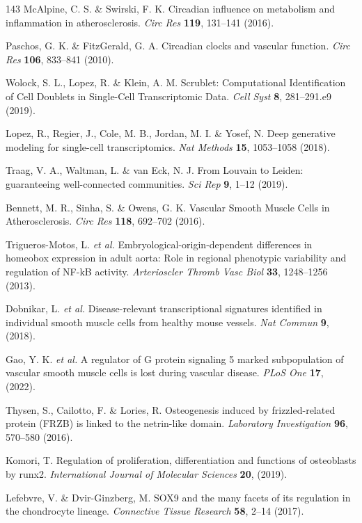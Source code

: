 \documentclass[12pt]{article}
\begin{document}
\begin{thebibliography}{143}
 McAlpine, C. S. \& Swirski, F. K. Circadian influence on metabolism and inflammation in atherosclerosis. \textit{Circ Res} \textbf{119}, 131--141 (2016).

 Paschos, G. K. \& FitzGerald, G. A. Circadian clocks and vascular function. \textit{Circ Res} \textbf{106}, 833--841 (2010).

 Wolock, S. L., Lopez, R. \& Klein, A. M. Scrublet: Computational Identification of Cell Doublets in Single-Cell Transcriptomic Data. \textit{Cell Syst} \textbf{8}, 281--291.e9 (2019).

 Lopez, R., Regier, J., Cole, M. B., Jordan, M. I. \& Yosef, N. Deep generative modeling for single-cell transcriptomics. \textit{Nat Methods} \textbf{15}, 1053--1058 (2018).

 Traag, V. A., Waltman, L. \& van Eck, N. J. From Louvain to Leiden: guaranteeing well-connected communities. \textit{Sci Rep} \textbf{9}, 1--12 (2019).

 Bennett, M. R., Sinha, S. \& Owens, G. K. Vascular Smooth Muscle Cells in Atherosclerosis. \textit{Circ Res} \textbf{118}, 692--702 (2016).

 Trigueros-Motos, L. \textit{et al.} Embryological-origin-dependent differences in homeobox expression in adult aorta: Role in regional phenotypic variability and regulation of NF-kB activity. \textit{Arterioscler Thromb Vasc Biol} \textbf{33}, 1248--1256 (2013).

 Dobnikar, L. \textit{et al.} Disease-relevant transcriptional signatures identified in individual smooth muscle cells from healthy mouse vessels. \textit{Nat Commun} \textbf{9}, (2018).

 Gao, Y. K. \textit{et al.} A regulator of G protein signaling 5 marked subpopulation of vascular smooth muscle cells is lost during vascular disease. \textit{PLoS One} \textbf{17}, (2022).

 Thysen, S., Cailotto, F. \& Lories, R. Osteogenesis induced by frizzled-related protein (FRZB) is linked to the netrin-like domain. \textit{Laboratory Investigation} \textbf{96}, 570--580 (2016).

 Komori, T. Regulation of proliferation, differentiation and functions of osteoblasts by runx2. \textit{International Journal of Molecular Sciences} \textbf{20}, (2019).

 Lefebvre, V. \& Dvir-Ginzberg, M. SOX9 and the many facets of its regulation in the chondrocyte lineage. \textit{Connective Tissue Research} \textbf{58}, 2--14 (2017).


\end{thebibliography}
\end{document}

